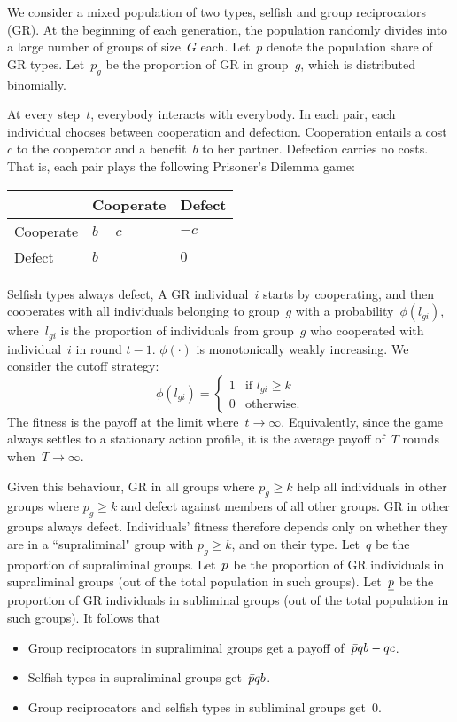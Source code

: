 \documentclass[12pt,a4paper]{article}
\begin{document}
We consider a mixed population of two types, selfish and group reciprocators (GR). At the beginning of each generation, the population randomly divides into a large number of groups of size~$G$ each.
Let~$p$ denote the population share of GR types. 
Let~$p_g$ be the proportion of GR in group~$g$, which is distributed binomially.

At every step~$t$, everybody interacts with everybody. In each pair, each individual chooses between cooperation and defection. Cooperation entails a cost~$c$ to the cooperator and a benefit~$b$ to her partner. Defection carries no costs. That is, each pair plays the following Prisoner's Dilemma game:
\begin{center}
    \begin{tabularx}{0.5\textwidth}{|x|x|x|}
        \hline
        &   Cooperate   &   Defect  \\
        \hline
        Cooperate   &   $b-c$   &   $-c$    \\
        \hline
        Defect  &   $b$ &   $0$   \\
        \hline
    \end{tabularx}
\end{center}

Selfish types always defect, A GR individual~$i$ starts by cooperating, and then cooperates with all individuals belonging to group~$g$ with a probability~$\phi(l_{gi})$, where~$l_{gi}$ is the proportion of individuals from group~$g$ who cooperated with individual~$i$ in round $t-1$.
$\phi(\cdot)$ is monotonically weakly increasing. We consider the cutoff strategy: 
$$
    \phi(l_{gi}) =
    \begin{cases}
        1   &   \text{if } l_{gi} \geq k  \\
        0   &   \text{otherwise.}
    \end{cases}
$$
The fitness is the payoff at the limit where~$t\to\infty$. Equivalently, since the game always settles to a stationary action profile, it is the average payoff of~$T$ rounds when~$T\to\infty$.

Given this behaviour, GR in all groups where $p_g \geq k$ help all individuals in other groups where $p_g \geq k$ and defect against members of all other groups. GR in other groups always defect.
%
Individuals' fitness therefore depends only on whether they are in a ``supraliminal" group with $p_g \geq k$, and on their type. Let~$q$ be the 
proportion of supraliminal groups. Let~$\bar{p}$ be the proportion of 
GR individuals in supraliminal groups (out of the total population in such groups). Let~$\underline{p}$ be the proportion of GR individuals in subliminal groups (out of the total population in such groups). It follows that
\begin{itemize}
    \item Group reciprocators in supraliminal groups get a payoff of~$\bar{p} qb - qc$.
    \item Selfish types in supraliminal groups get~$\bar{p} qb$.
    \item Group reciprocators and selfish types in subliminal groups get~$0$.
\end{itemize}
\end{document}
